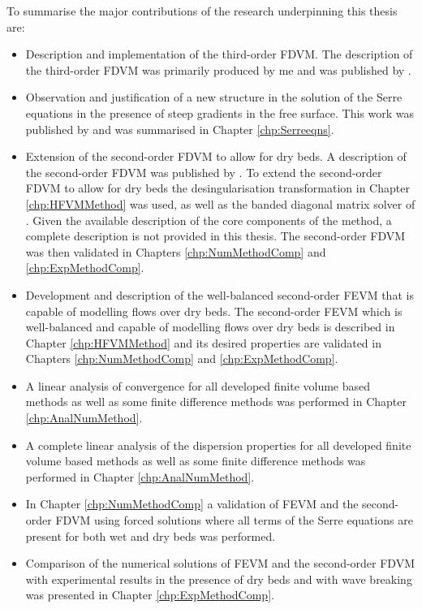 To summarise the major contributions of the research underpinning this thesis are:
\begin{itemize}
	\item Description and implementation of the third-order FDVM. The description of the third-order FDVM was primarily produced by me and was published by \citet{Zoppou-etal-2017}.
	\item Observation and justification of a new structure in the solution of the Serre equations in the presence of steep gradients in the free surface. This work was published by \citet{Pitt-2018-61} and was summarised in Chapter \ref{chp:Serreeqns}.
	\item Extension of the second-order FDVM to allow for dry beds. A description of the second-order FDVM was published by \citet{Zoppou-etal-2017}. To extend the second-order FDVM to allow for dry beds the desingularisation transformation in Chapter \ref{chp:HFVMMethod} was used, as well as the banded diagonal matrix solver of \citet{NumRecC-1996}. Given the available description of the core components of the method, a complete description is not provided in this thesis. The second-order FDVM was then validated in Chapters \ref{chp:NumMethodComp} and \ref{chp:ExpMethodComp}.
	\item Development and description of the well-balanced second-order FEVM that is capable of modelling flows over dry beds. The second-order FEVM which is well-balanced and capable of modelling flows over dry beds is described in Chapter \ref{chp:HFVMMethod} and its desired properties are validated in Chapters \ref{chp:NumMethodComp} and \ref{chp:ExpMethodComp}.
	\item A linear analysis of convergence for all developed finite volume based methods as well as some finite difference methods was performed in Chapter \ref{chp:AnalNumMethod}.
	\item A complete linear analysis of the dispersion properties for all developed finite volume based methods as well as some finite difference methods was performed in Chapter \ref{chp:AnalNumMethod}.
	\item In Chapter \ref{chp:NumMethodComp} a validation of FEVM and the second-order FDVM using forced solutions where all terms of the Serre equations are present for both wet and dry beds was performed.
	\item Comparison of the numerical solutions of FEVM and the second-order FDVM with experimental results in the presence of dry beds and with wave breaking was presented in Chapter \ref{chp:ExpMethodComp}. 
\end{itemize}

